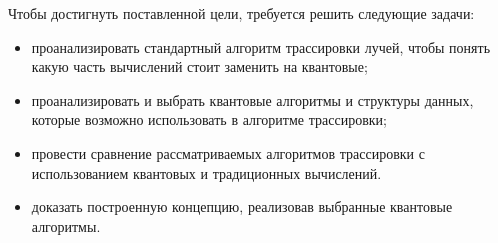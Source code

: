 Чтобы достигнуть поставленной цели, требуется решить следующие задачи:

\begin{itemize}
    \item проанализировать стандартный алгоритм трассировки лучей, чтобы
понять какую часть вычислений стоит заменить на квантовые;
    \item проанализировать и выбрать квантовые алгоритмы и структуры данных, которые возможно использовать в алгоритме трассировки;
    \item провести сравнение рассматриваемых алгоритмов трассировки с использованием квантовых и традиционных вычислений.
    \item доказать построенную концепцию, реализовав выбранные квантовые алгоритмы.
\end{itemize}
